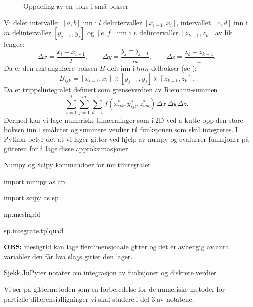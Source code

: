 \begin{figure}[ht]
\caption{Oppdeling av en boks i små bokser}\label{3Dbox}
\end{figure}
Vi deler intervallet \( [a, b] \) inn i \( l \) delintervaller \( [x_{i-1}, x_i] \), intervallet \( [c, d] \) inn i \( m \) delintervaller \( [y_{j-1}, y_j] \) og \( [e, f] \) inn i \( n \) delintervaller \( [z_{k-1}, z_k] \) av lik lengde:
\[
\Delta x = \frac{x_i - x_{i-1}}{l}, \qquad \Delta y = \frac{y_j - y_{j-1}}{m}, \qquad \Delta z = \frac{z_k - z_{k-1}}{n}.
\]
Da er den rektangulære boksen \( B \) delt inn i \( lmn \) delbokser  (se ):
\[
B_{ijk} = [x_{i-1}, x_i] \times [y_{j-1}, y_j] \times [z_{k-1}, z_k].
\]
Da er trippelintegralet definert som grenseverdien av Riemann-summen
\[
\sum_{i=1}^{l} \sum_{j=1}^{m} \sum_{k=1}^{n} f(x^{*}_{ijk}, y^{*}_{ijk}, z^{*}_{ijk}) \, \Delta x \, \Delta y \, \Delta z.
\]
Dermed kan vi lage numeriske tilnærminger som i 2D ved å kutte opp den store boksen inn i småbiter og summere verdier til funksjonen som skal integreres.
I Python betyr det at vi lager gitter ved hjelp av numpy og evaluerer funksjoner på gitteren for å lage disse approksimasjoner.

\begin{oppsum}{Numpy og Scipy kommandoer for multiintegraler}

\begin{minipage}{.9\columnwidth}
\begin{lst}{}
import numpy as np

import scipy as sp

np.meshgrid

sp.integrate.tplquad
\end{lst}
\end{minipage}
\textbf{OBS:} meshgrid kan lage flerdimensjonale gitter og det er avhengig av antall variabler den får hva slags gitter den lager.
\end{oppsum}
Sjekk JuPyter notater om integrasjon av funksjoner og diskrete verdier.

Vi ser på gittermetoden som en forberedelse for de numeriske metoder for partielle differensialligninger vi skal studere i del 3 av notatene.
\newpage
